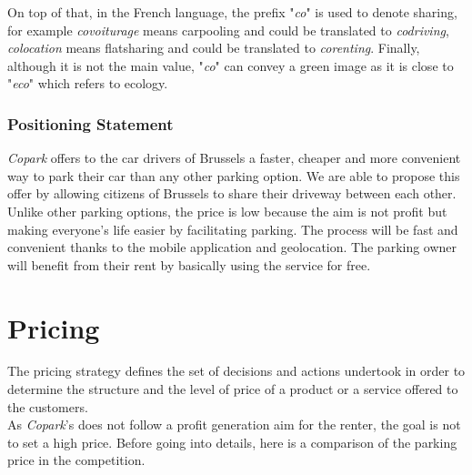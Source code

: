 \documentclass[12pt,a4paper,oneside]{book}
\newcommand{\bp}{\textit{Copark}}
\begin{document}
On top of that, in the French language, the prefix "\textit{co}" is used to denote sharing, for example \textit{covoiturage} means carpooling and could be translated to \textit{codriving}, \textit{colocation} means flatsharing and could be translated to \textit{corenting}. Finally, although it is not the main value, "\textit{co}" can convey a green image as it is close to "\textit{eco}" which refers to ecology.

\subsubsection{Positioning Statement}

\bp{} offers to the car drivers of Brussels a faster, cheaper and more convenient way to park their car than any other parking option. We are able to propose this offer by allowing citizens of Brussels to share their driveway between each other. Unlike other parking options, the price is low because the aim is not profit but making everyone's life easier by facilitating parking. The process will be fast and convenient thanks to the mobile application and geolocation. The parking owner will benefit from their rent by basically using the service for free. 

\section{Pricing}
\label{priceana}

The pricing strategy defines the set of decisions and actions undertook in order to determine the structure and the level of price of a product or a service offered to the customers.\\

As \bp{}'s does not follow a profit generation aim for the renter, the goal is not to set a high price. Before going into details, here is a comparison of the parking price in the competition.
\end{document}

